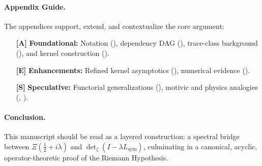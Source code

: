 \paragraph*{Appendix Guide.}
The appendices support, extend, and contextualize the core argument:

\begin{itemize}
  \item[\textbf{[A]}] \textbf{Foundational:} Notation (), dependency DAG (), trace-class background (), and kernel construction ().
  \item[\textbf{[E]}] \textbf{Enhancements:} Refined kernel asymptotics (), numerical evidence ().
  \item[\textbf{[S]}] \textbf{Speculative:} Functorial generalizations (), motivic and physics analogies (, ).
\end{itemize}

\paragraph*{Conclusion.}
This manuscript should be read as a layered construction: a spectral bridge between \( \Xi(\tfrac{1}{2}+i\lambda) \) and \( \det\nolimits_{\zeta}(I - \lambda L_{\mathrm{sym}}) \), culminating in a canonical, acyclic, operator-theoretic proof of the Riemann Hypothesis.
